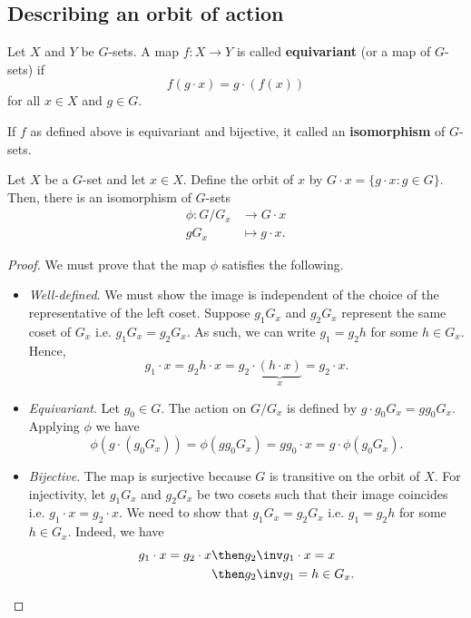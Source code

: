 \documentclass[12pt, a4paper]{article}
\begin{document}
\subsection{Describing an orbit of action}

\begin{definition}
    Let \(X\) and \(Y\) be \(G\)-sets. A map \(f:X \to Y\) is called \textbf{equivariant} (or a map of \(G\)-sets) if 
    \[f(g\cdot x) = g\cdot (f(x))\]
    for all \(x \in X\) and \(g \in G\).
\end{definition}

\begin{definition}
    If \(f\) as defined above is equivariant and bijective, it called an \textbf{isomorphism} of \(G\)-sets.
\end{definition}

\begin{lemma}
    Let \(X\) be a \(G\)-set and let \(x \in X\). Define the orbit  of \(x\) by \(G \cdot x = \{g\cdot x : g \in G\}\). Then, there is an isomorphism of \(G\)-sets 
    \[\begin{aligned}
        \phi: G/G_x &\to G \cdot x \\
        gG_x &\mapsto g\cdot x.
    \end{aligned}\]
\end{lemma}

\begin{proof}
    We must prove that the map \(\phi\) satisfies the following.
    \begin{itemize}
        \item \textit{Well-defined}. We must show the image is independent of the choice of the representative of the left coset. Suppose \(g_1 G_x\) and \(g_2G_x\) represent the same coset of \(G_x\) i.e. \(g_1G_x =g_2G_x\). As such, we can write \(g_1 = g_2h\) for some \(h \in G_x\). Hence,
        \[g_1\cdot x=g_2h\cdot x = g_2 \cdot \underbrace{(h \cdot x)}_{x}=g_2 \cdot x.\]
        \item \textit{Equivariant}.  Let \(g_0 \in G\). The action on \(G/G_x\) is defined by \(g\cdot g_0G_x =gg_0G_x\). Applying \(\phi\) we have 
        \[\phi(g\cdot (g_0G_x))=\phi(gg_0G_x)=gg_0\cdot x = g \cdot \phi(g_0 G_x).\]
        \item \textit{Bijective}. The map is surjective because \(G\) is transitive on the orbit of \(X\). For injectivity, let \(g_1G_x\) and \(g_2G_x\) be two cosets such that their image coincides i.e. \(g_1 \cdot x = g_2 \cdot x\). We need to show that \(g_1G_x = g_2G_x\) i.e. \(g_1=g_2h\) for some \(h\in G_x\). Indeed, we have
        \[\begin{aligned}
            g_1\cdot x=g_2 \cdot x &\then g_2\inv g_1 \cdot x =x \\
            &\then g_2\inv g_1= h\in G_x.
        \end{aligned}\]
    \end{itemize}
\end{proof}
\end{document}
